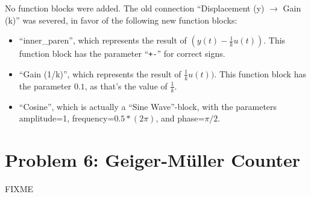 \documentclass[a4paper,parskip,headheight=38pt]{scrartcl} %
\begin{document}
No function blocks were added.  The old connection
\enquote{Displacement (y) $\rightarrow$ Gain (k)} was severed, in favor
of the following new function blocks:
\begin{itemize}
    \item \enquote{inner\_paren}, which represents the result of $(y(t)
    - \frac{1}{k}u(t))$.  This function block has the parameter
    \enquote{\texttt{+-}} for correct signs.
    \item \enquote{Gain (1/k)}, which represents the result of
    $\frac{1}{k}u(t))$.  This function block has the parameter $0.1$,
    as that's the value of $\frac{1}{k}$.
    \item \enquote{Cosine}, which is actually a \enquote{Sine
    Wave}-block, with the parameters amplitude=1,
    frequency=$0.5*(2\pi)$, and phase=$\pi/2$.
\end{itemize}


\section*{Problem 6: Geiger-Müller Counter}

FIXME
\end{document}
